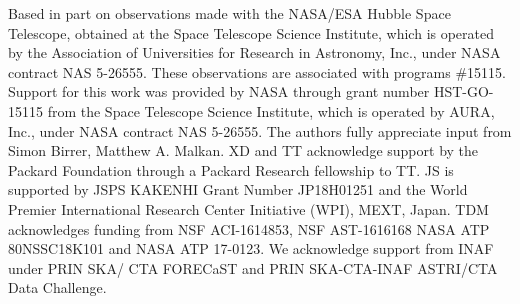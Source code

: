 \documentclass[twocolumn,trackchanges]{aastex63}
\newcommand{\hst}{{\it HST}}
\newcommand{\mbh}{$\mathcal M_{\rm BH}$}
\newcommand{\lhost}{$L_{\rm host}$}
\newcommand{\mstar}{{$M_*$}}
\begin{document}



\acknowledgments
Based in part on observations made with the NASA/ESA Hubble Space Telescope, obtained at the Space Telescope Science Institute, which is operated by the Association of Universities for Research in Astronomy, Inc., under NASA contract NAS 5-26555. These observations are associated with programs \#15115. Support for this work was provided by NASA through grant number HST-GO-15115 from the Space Telescope Science Institute, which is operated by AURA, Inc., under NASA contract NAS 5-26555. The authors fully appreciate input from Simon Birrer, Matthew A. Malkan. XD and TT acknowledge support by the Packard Foundation through a Packard Research fellowship to TT. JS is supported by JSPS KAKENHI Grant Number JP18H01251 and the World Premier International Research Center Initiative (WPI), MEXT, Japan. TDM acknowledges funding from NSF ACI-1614853,  NSF AST-1616168 NASA ATP 80NSSC18K101 and NASA ATP 17-0123. We acknowledge support from INAF under PRIN SKA/ CTA FORECaST and PRIN SKA-CTA-INAF ASTRI/CTA Data Challenge. 


%


\end{document}
